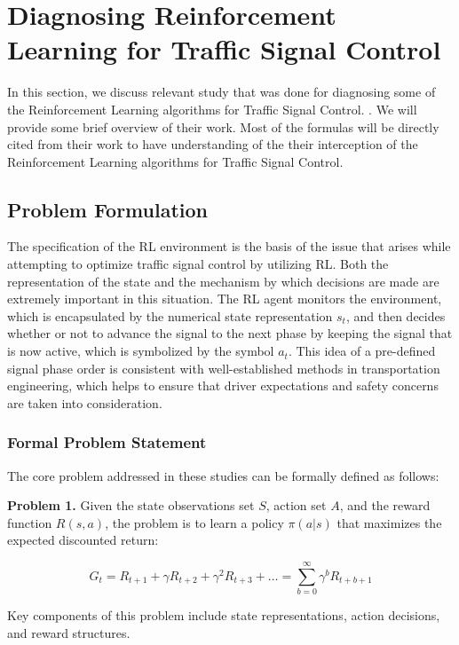 \section{Diagnosing Reinforcement Learning for Traffic Signal Control}
In this section, we discuss relevant study that was done for diagnosing some of the Reinforcement Learning algorithms for Traffic Signal Control. \cite{zheng2019diagnosing}. We will provide some brief overview of their work. Most of the formulas will be directly cited from their work to have understanding of the their interception of the Reinforcement Learning algorithms for Traffic Signal Control.

\subsection{Problem Formulation}

The specification of the RL environment is the basis of the issue that arises while attempting to optimize traffic signal control by utilizing RL. Both the representation of the state and the mechanism by which decisions are made are extremely important in this situation. The RL agent monitors the environment, which is encapsulated by the numerical state representation $s_t$, and then decides whether or not to advance the signal to the next phase by keeping the signal that is now active, which is symbolized by the symbol $a_t$. This idea of a pre-defined signal phase order is consistent with well-established methods in transportation engineering\cite{sutton1999between,urbanik2015signal}, which helps to ensure that driver expectations and safety concerns are taken into consideration.


\subsubsection{Formal Problem Statement}

The core problem addressed in these studies can be formally defined as follows:

\textbf{Problem 1.} Given the state observations set $S$, action set $A$, and the reward function $R(s, a)$, the problem is to learn a policy $\pi(a|s)$ that maximizes the expected discounted return:

\[
G_t = R_{t+1} + \gamma R_{t+2} + \gamma^2 R_{t+3} + \ldots = \sum_{b=0}^{\infty} \gamma^b R_{t+b+1}
\]

Key components of this problem include state representations, action decisions, and reward structures.

